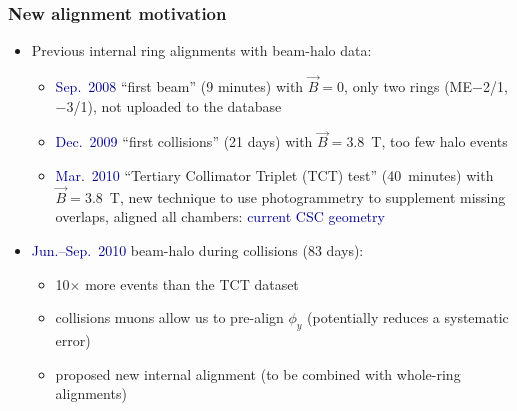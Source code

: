 \documentclass[compress]{beamer}
\begin{document}
\begin{frame}
\frametitle{New alignment motivation}
\begin{itemize}
\item Previous internal ring alignments with beam-halo data:
\begin{itemize}
\item \textcolor{darkblue}{Sep.\ 2008} ``first beam'' (9 minutes) with $\vec{B}=0$, only two rings (ME$-$2/1, $-$3/1), not uploaded to the database
\item \textcolor{darkblue}{Dec.\ 2009} ``first collisions'' (21 days) with $\vec{B}=3.8$~T, too few halo events
\item \textcolor{darkblue}{Mar.\ 2010} ``Tertiary Collimator Triplet (TCT) test'' (40~minutes) with $\vec{B}=3.8$~T, new technique to use photogrammetry to supplement missing overlaps, aligned all chambers: \textcolor{darkblue}{current CSC geometry}
\end{itemize}
\item \textcolor{darkblue}{Jun.--Sep.\ 2010} beam-halo during collisions (83 days):
\begin{itemize}
\item 10$\times$ more events than the TCT dataset
\item collisions muons allow us to pre-align $\phi_y$ (potentially reduces a systematic error)
\item proposed new internal alignment (to be combined with whole-ring alignments)
\end{itemize}
\end{itemize}
\end{frame}
\end{document}
